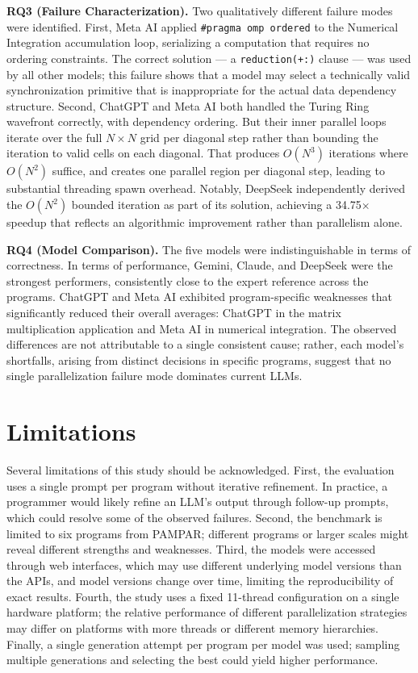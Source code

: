 \textbf{RQ3 (Failure Characterization).} Two qualitatively different failure modes were identified. 
First, Meta AI applied \texttt{\#pragma omp ordered} to the Numerical Integration accumulation loop, serializing a computation that requires no ordering constraints. 
The correct solution — a \texttt{reduction(+:)} clause — was used by all other models; this failure shows that a model may select a technically valid synchronization primitive that is inappropriate for the actual data dependency structure. 
Second, ChatGPT and Meta AI both handled the Turing Ring wavefront correctly, with dependency ordering.
But their inner parallel loops iterate over the full $N \times N$ grid per diagonal step rather than bounding the iteration to valid cells on each diagonal. 
That produces $O(N^3)$ iterations where $O(N^2)$ suffice, and creates one parallel region per diagonal step, leading to substantial threading spawn overhead. 
Notably, DeepSeek independently derived the $O(N^2)$ bounded iteration as part of its solution, achieving a 34.75$\times$ speedup that reflects an algorithmic improvement rather than parallelism alone.

\textbf{RQ4 (Model Comparison).} The five models were indistinguishable in terms of correctness. In terms of performance, Gemini, Claude, and DeepSeek were the strongest performers, consistently close to the expert reference across the programs. 
ChatGPT and Meta AI exhibited program-specific weaknesses that significantly reduced their overall averages: ChatGPT in the matrix multiplication application and Meta AI in numerical integration. 
The observed differences are not attributable to a single consistent cause; rather, each model's shortfalls, arising from distinct decisions in specific programs, suggest that no single parallelization failure mode dominates current LLMs.

\section{Limitations}
\label{sec:conclusion_limitations}

Several limitations of this study should be acknowledged. 
First, the evaluation uses a single prompt per program without iterative refinement. In practice, a programmer would likely refine an LLM's output through follow-up prompts, which could resolve some of the observed failures. 
Second, the benchmark is limited to six programs from PAMPAR; different programs or larger scales might reveal different strengths and weaknesses. 
Third, the models were accessed through web interfaces, which may use different underlying model versions than the APIs, and model versions change over time, limiting the reproducibility of exact results. 
Fourth, the study uses a fixed 11-thread configuration on a single hardware platform; the relative performance of different parallelization strategies may differ on platforms with more threads or different memory hierarchies. 
Finally, a single generation attempt per program per model was used; sampling multiple generations and selecting the best could yield higher performance.

